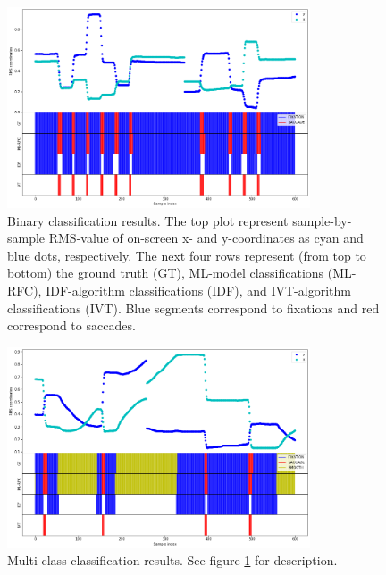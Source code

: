 \begin{figure}[h]
    \centering
    \includegraphics[width=0.8\textwidth]{Images/Classification/BinaryClassification.png}
    \caption{Binary classification results. The top plot represent sample-by-sample RMS-value of on-screen x- and y-coordinates as cyan and blue dots, respectively. The next four rows represent (from top to bottom) the ground truth (GT), ML-model classifications (ML-RFC), IDF-algorithm classifications (IDF), and IVT-algorithm classifications (IVT). Blue segments correspond to fixations and red correspond to saccades.}
    \label{fig:res_BinaryClassification}
\end{figure}

\begin{figure}[h]
    \centering
    \includegraphics[width=0.8\textwidth]{Images/Classification/MultiClassification.png}
    \caption{Multi-class classification results. See figure \ref{fig:res_BinaryClassification} for description. }
    \label{fig:res_MultiClassification}
\end{figure}


